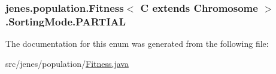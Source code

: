 \hypertarget{enumjenes_1_1population_1_1_fitness_3_01_c_01extends_01_chromosome_01_4_1_1_sorting_mode_a2cb76e719083d62c0a13a3bcb947aa72}{
\subsubsection[{P\-A\-R\-T\-I\-A\-L}]{\setlength{\rightskip}{0pt plus 5cm}jenes.\-population.\-Fitness$<$ C extends Chromosome $>$.Sorting\-Mode.\-P\-A\-R\-T\-I\-A\-L}}\label{enumjenes_1_1population_1_1_fitness_3_01_c_01extends_01_chromosome_01_4_1_1_sorting_mode_a2cb76e719083d62c0a13a3bcb947aa72}


The documentation for this enum was generated from the following file\-:\begin{DoxyCompactItemize}
\item 
src/jenes/population/\hyperlink{_fitness_8java}{Fitness.\-java}\end{DoxyCompactItemize}
